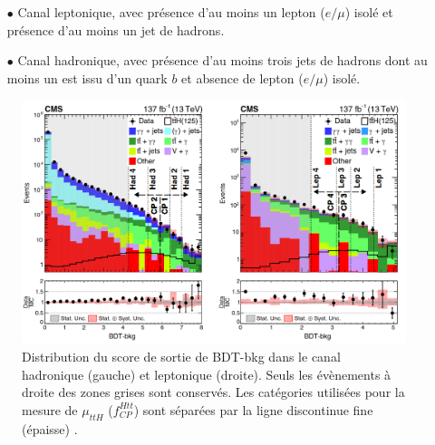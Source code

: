     \begin{itemize}
        \smallskip
        \item[$\bullet$] Canal leptonique, avec présence d'au moins un lepton ($e/\mu$) isolé et présence d'au moins un jet de hadrons.
        \smallskip
        \item[$\bullet$] Canal hadronique, avec présence d'au moins trois jets de hadrons dont au moins un est issu d'un quark $b$ et absence de lepton ($e/\mu$) isolé.
        \smallskip
    \end{itemize}

        \begin{figure}
    \centering
    \includegraphics[scale=0.35]{Chapitre5/Images/BDTbkg.png} 
    \caption{Distribution du score de sortie de BDT-bkg dans le canal hadronique (gauche) et leptonique (droite). Seuls les évènements à droite des zones grises sont conservés. Les catégories utilisées pour la mesure de $\mu_{ttH}$ ($f_{CP}^{Htt}$) sont séparées par la ligne discontinue fine (épaisse) \cite{ttH}.}
    \label{BDTbkg}
\end{figure}

